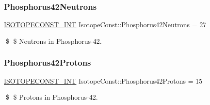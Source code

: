 \subsubsection{\texorpdfstring{Phosphorus42\+Neutrons}{Phosphorus42Neutrons}}
{\footnotesize\ttfamily \mbox{\hyperlink{group___isotope_const-_macros_ga5f18360b3e99483a35c32d789e62621c}{I\+S\+O\+T\+O\+P\+E\+C\+O\+N\+S\+T\+\_\+\+I\+NT}} Isotope\+Const\+::\+Phosphorus42\+Neutrons = 27}

\$ \$ Neutrons in Phosphorus-\/42. \mbox{\label{group___isotope_const-_phosphorus-_p42_gac4031e8c815ddaae2ecb539ffbe7a4d2}} 
\subsubsection{\texorpdfstring{Phosphorus42\+Protons}{Phosphorus42Protons}}
{\footnotesize\ttfamily \mbox{\hyperlink{group___isotope_const-_macros_ga5f18360b3e99483a35c32d789e62621c}{I\+S\+O\+T\+O\+P\+E\+C\+O\+N\+S\+T\+\_\+\+I\+NT}} Isotope\+Const\+::\+Phosphorus42\+Protons = 15}

\$ \$ Protons in Phosphorus-\/42. 